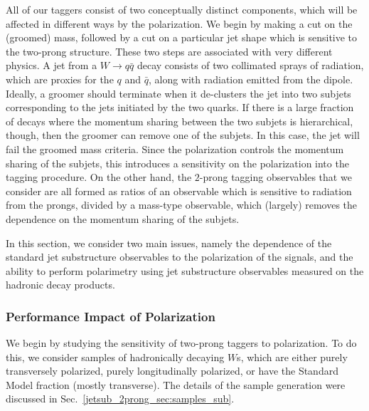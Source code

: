 \documentclass[11pt]{cernrep}
\begin{document}
All of our taggers consist of two conceptually distinct components, which will be affected in different ways by the polarization.
%
We begin by making a cut on the (groomed) mass, followed by a cut on a particular jet shape which is sensitive to the two-prong structure. These two steps are associated with very different physics. A jet from a $W\to q\bar q$ decay consists of two collimated sprays of radiation, which are proxies for the $q$ and $\bar q$, along with radiation emitted from the dipole.
%
Ideally, a groomer should terminate when it de-clusters the jet into two subjets corresponding to the jets initiated by the two quarks.
%
If there is a large fraction of decays where the momentum sharing between the two subjets is hierarchical, though, then the groomer can remove one of the subjets.
%
In this case, the jet will fail the groomed mass criteria.
%
Since the polarization controls the momentum sharing of the subjets, this introduces a sensitivity on the polarization into the tagging procedure.
%
On the other hand, the $2$-prong tagging observables that we consider are all formed as ratios of an observable which is sensitive to radiation from the prongs, divided by a mass-type observable, which (largely) removes the dependence on the momentum sharing of the subjets.

In this section, we consider two main issues, namely
the dependence of the standard jet substructure observables to the
polarization of the signals, and the ability to perform polarimetry
using jet substructure observables measured on the hadronic decay
products.

\subsubsection{Performance Impact of Polarization}\label{jetsub_2prong_sec:polar_robust}


We begin by studying the sensitivity of two-prong taggers to polarization.
%
To do this, we consider samples of hadronically decaying $W$s, which are either purely transversely polarized, purely longitudinally polarized, or have the Standard Model fraction (mostly transverse).
%
The details of the sample generation were discussed in Sec.~\ref{jetsub_2prong_sec:samples_sub}.
\end{document}
